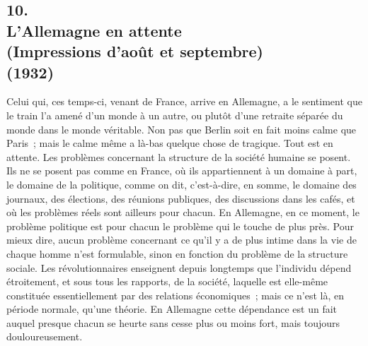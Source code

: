 \documentclass[french,twoside]{book} %
\begin{document}
\subsection[10. L'Allemagne en attente, (Impressions d'août et septembre) (1932)]{10. \\
L'Allemagne en attente \\
(Impressions d'août et septembre) \\
(1932)}
\noindent \par
Celui qui, ces temps-ci, venant de France, arrive en Allemagne, a le sentiment que le train l'a amené d'un monde à un autre, ou plutôt d'une retraite séparée du monde dans le monde véritable. Non pas que Berlin soit en fait moins calme que Paris ; mais le calme même a là-bas quelque chose de tragi­que. Tout est en attente. Les problèmes concernant la structure de la société humaine se posent. Ils ne se posent pas comme en France, où ils appartiennent à un domaine à part, le domaine de la politique, comme on dit, c'est-à-dire, en somme, le domaine des journaux, des élections, des réunions publiques, des discussions dans les cafés, et où les problèmes réels sont ailleurs pour chacun. En Allemagne, en ce moment, le problème politique est pour chacun le problème qui le touche de plus près. Pour mieux dire, aucun problème concer­nant ce qu'il y a de plus intime dans la vie de chaque homme n'est formulable, sinon en fonction du problème de la structure sociale. Les révolutionnaires enseignent depuis longtemps que l'individu dépend étroitement, et sous tous les rapports, de la société, laquelle est elle-même constituée essentiellement par des relations économiques ; mais ce n'est là, en période normale, qu'une théorie. En Allemagne cette dépendance est un fait auquel presque chacun se heurte sans cesse plus ou moins fort, mais toujours douloureusement.\par
\end{document}
